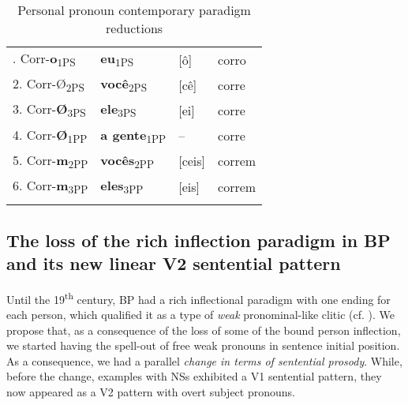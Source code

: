 \documentclass[output=paper,colorlinks,citecolor=brown]{langscibook}
\begin{document}
\begin{table}
\caption{Personal pronoun contemporary paradigm reductions}
\label{03:table5}
 \begin{tabular}{llll}
  \lsptoprule
1. Corr-\textbf{o}\textsubscript{1PS} & \textbf{eu}\textsubscript{1PS} & [ô] & corro\\
2. Corr-\textbf{}Ø\textsubscript{2PS} & \textbf{você}\textsubscript{2PS} & [cê] & corre\\
3. Corr-\textbf{Ø}\textsubscript{3PS} & \textbf{ele}\textsubscript{3PS} & [ei] & corre\\
4. Corr-\textbf{Ø}\textsubscript{1PP} & \textbf{a gente}\textsubscript{1PP} & -- & corre\\
5. Corr-\textbf{m}\textsubscript{2PP} & \textbf{vocês}\textsubscript{2PP} & [ceis] & correm\\
6. Corr-\textbf{m}\textsubscript{3PP} & \textbf{eles}\textsubscript{3PP} & [eis] & correm\\
  \lspbottomrule
 \end{tabular}
\end{table}



\subsection{The loss of the rich inflection paradigm in BP and its new linear V2 sentential pattern}

Until the 19\textsuperscript{th} century, BP had a rich inflectional paradigm with one ending for each person, which qualified it as a type of \emph{weak} pronominal-like clitic (cf. \citealt{kato_strong_1999}). We propose that, as a consequence of the loss of some of the bound person inflection, we started having the spell-out of free weak pronouns in sentence initial position. As a consequence, we had a parallel \emph{change in terms of sentential prosody}. While, before the change, examples with NSs exhibited a V1 sentential pattern, they now appeared as a V2 pattern with overt subject pronouns.
\end{document}

